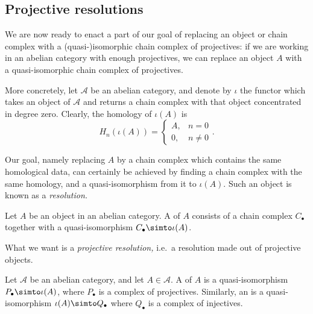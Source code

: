 \documentclass[main.tex]{subfiles}
\begin{document}
\subsection{Projective resolutions}
\label{ssc:projective_resolutions}

We are now ready to enact a part of our goal of replacing an object or chain complex with a (quasi-)isomorphic chain complex of projectives: if we are working in an abelian category with enough projectives, we can replace an object $A$ with a quasi-isomorphic chain complex of projectives.

More concretely, let $\mathcal{A}$ be an abelian category, and denote by $\iota$ the functor which takes an object of $\mathcal{A}$ and returns a chain complex with that object concentrated in degree zero. Clearly, the homology of $\iota(A)$ is
\begin{equation*}
  H_{n}(\iota(A)) =
  \begin{cases}
    A, &n = 0 \\
    0, &n \neq 0
  \end{cases}.
\end{equation*}

Our goal, namely replacing $A$ by a chain complex which contains the same homological data, can certainly be achieved by finding a chain complex with the same homology, and a quasi-isomorphism from it to $\iota(A)$. Such an object is known as a \emph{resolution.}

\begin{definition}[resolution]
  \label{def:resolution}
  Let $A$ be an object in an abelian category. A  of $A$ consists of a chain complex $C_{\bullet}$ together with a quasi-isomorphism $C_{\bullet} \simto \iota(A)$.
\end{definition}

What we want is a \emph{projective resolution,} i.e.\ a resolution made out of projective objects.

\begin{definition}
  \label{def:projective_injective_resolution}
  Let $\mathcal{A}$ be an abelian category, and let $A \in \mathcal{A}$. A  of $A$ is a quasi-isomorphism $P_{\bullet} \simto \iota(A)$, where $P_{\bullet}$ is a complex of projectives. Similarly, an  is a quasi-isomorphism $\iota(A) \simto Q_{\bullet}$ where $Q_{\bullet}$ is a complex of injectives.
\end{definition}
\end{document}
